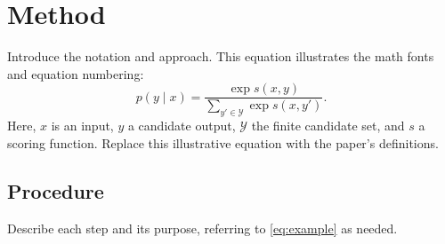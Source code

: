 \section{Method}
\label{sec:method}
Introduce the notation and approach. This equation illustrates the math
fonts and equation numbering:
\begin{equation}
  p(y \mid x) = \frac{\exp s(x,y)}{\sum_{y' \in \mathcal{Y}} \exp s(x,y')}.
  \label{eq:example}
\end{equation}
Here, $x$ is an input, $y$ a candidate output, $\mathcal{Y}$ the finite
candidate set, and $s$ a scoring function. Replace this illustrative equation
with the paper's definitions.

\subsection{Procedure}
\label{sec:procedure}
Describe each step and its purpose, referring to \cref{eq:example} as needed.
